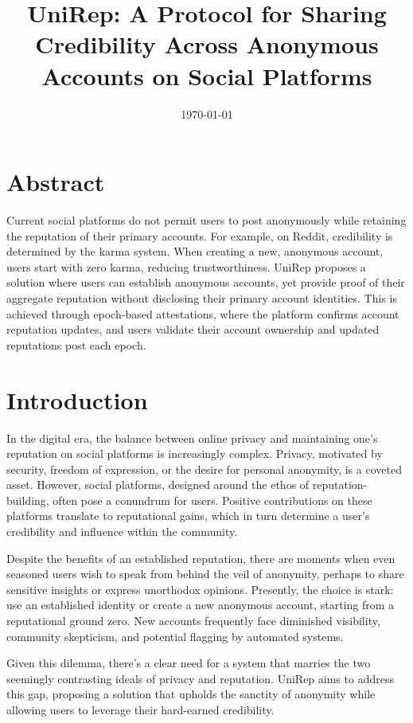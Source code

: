 \documentclass[11pt]{article}
\author{}
\date{\today}
\title{UniRep: A Protocol for Sharing Credibility Across Anonymous Accounts on Social Platforms}
\begin{document}
\maketitle
\tableofcontents

\section{Abstract}
\label{sec:org76122d5}

Current social platforms do not permit users to post anonymously while retaining the reputation of their primary accounts. For example, on Reddit, credibility is determined by the karma system. When creating a new, anonymous account, users start with zero karma, reducing trustworthiness. UniRep proposes a solution where users can establish anonymous accounts, yet provide proof of their aggregate reputation without disclosing their primary account identities. This is achieved through epoch-based attestations, where the platform confirms account reputation updates, and users validate their account ownership and updated reputations post each epoch.
\section{Introduction}
\label{sec:org0014497}

In the digital era, the balance between online privacy and maintaining one's reputation on social platforms is increasingly complex. Privacy, motivated by security, freedom of expression, or the desire for personal anonymity, is a coveted asset. However, social platforms, designed around the ethos of reputation-building, often pose a conundrum for users. Positive contributions on these platforms translate to reputational gains, which in turn determine a user's credibility and influence within the community.

Despite the benefits of an established reputation, there are moments when even seasoned users wish to speak from behind the veil of anonymity, perhaps to share sensitive insights or express unorthodox opinions. Presently, the choice is stark: use an established identity or create a new anonymous account, starting from a reputational ground zero. New accounts frequently face diminished visibility, community skepticism, and potential flagging by automated systems.

Given this dilemma, there's a clear need for a system that marries the two seemingly contrasting ideals of privacy and reputation. UniRep aims to address this gap, proposing a solution that upholds the sanctity of anonymity while allowing users to leverage their hard-earned credibility.
\end{document}
